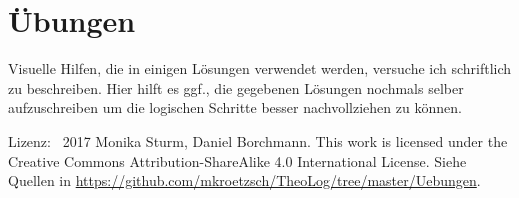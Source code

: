 \section{Übungen}
{\footnotesize Visuelle Hilfen, die in einigen Lösungen verwendet werden, versuche ich schriftlich zu beschreiben. Hier hilft es ggf., die gegebenen Lösungen nochmals selber aufzuschreiben um die logischen Schritte besser nachvollziehen zu können.

Lizenz: \textcopyright\ 2017 Monika Sturm, Daniel Borchmann. This work is licensed under the Creative Commons Attribution-ShareAlike 4.0 International License. Siehe Quellen in \url{https://github.com/mkroetzsch/TheoLog/tree/master/Uebungen}.}








